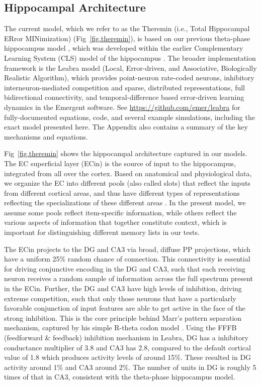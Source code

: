 \documentclass[11pt,twoside]{article}
\newif\myifpdf
\begin{document}
\subsection{Hippocampal Architecture}

The current model, which we refer to as the Theremin (i.e., Total Hippocampal ERror MINimization) (Fig~\ref{fig.theremin}), is based on our previous theta-phase hippocampus model \citep{KetzMorkondaOReilly13}, which was developed within the earlier Complementary Learning System (CLS) model of the hippocampus \citep{NormanOReilly03,OReillyRudy01}.  The broader implementation framework is the Leabra model (Local, Error-driven, and Associative, Biologically Realistic Algorithm), which provides point-neuron rate-coded neurons, inhibitory interneuron-mediated competition and sparse, distributed representations, full bidirectional connectivity, and temporal-difference based error-driven learning dynamics \citep{OReillyMunakata00,OReillyMunakataFrankEtAl12} in the Emergent software.  See \url{https://github.com/emer/leabra} for fully-documented equations, code, and several example simulations, including the exact model presented here.  The Appendix also contains a summary of the key mechanisms and equations.

Fig~\ref{fig.theremin} shows the hippocampal architecture captured in our models. The EC superficial layer (ECin) is the source of input to the hippocampus, integrated from all over the cortex.  Based on anatomical and physiological data, we organize the EC into different pools (also called slots) that reflect the inputs from different cortical areas, and thus have different types of representations reflecting the specializations of these different areas \citep{WitterDoanJacobsenEtAl17}.  In the present model, we assume some pools reflect item-specific information, while others reflect the various aspects of information that together constitute context, which is important for distinguishing different memory lists in our tests.

The ECin projects to the DG and CA3 via broad, diffuse PP projections, which have a uniform 25\% random chance of connection.  This connectivity is essential for driving conjunctive encoding in the DG and CA3, such that each receiving neuron receives a random sample of information across the full spectrum present in the ECin.  Further, the DG and CA3 have high levels of inhibition, driving extreme competition, such that only those neurons that have a particularly favorable conjunction of input features are able to get active in the face of the strong inhibition.  This is the core principle behind Marr's pattern separation mechanism, captured by his simple R-theta codon model \citep{Marr71}.  Using the FFFB (feedforward \& feedback) inhibition mechanism in Leabra, DG has a inhibitory conductance multiplier of 3.8 and CA3 has 2.8, compared to the default cortical value of 1.8 which produces activity levels of around 15\%.  These resulted in DG activity around 1\% and CA3 around 2\%.  The number of units in DG is roughly 5 times of that in CA3, consistent with the theta-phase hippocampus model.
\end{document}
